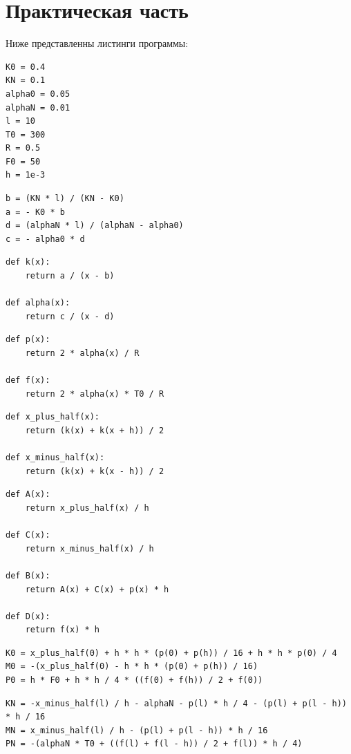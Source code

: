 \chapter{Практическая часть}

Ниже представленны листинги программы:

\lstset{language=python}
\begin{lstlisting}[caption=Исходные данные]
K0 = 0.4
KN = 0.1
alpha0 = 0.05
alphaN = 0.01
l = 10
T0 = 300
R = 0.5
F0 = 50
h = 1e-3
\end{lstlisting}

\lstset{language=python}
\begin{lstlisting}[caption=Параметры для краевых условий]
b = (KN * l) / (KN - K0)
a = - K0 * b
d = (alphaN * l) / (alphaN - alpha0)
c = - alpha0 * d
\end{lstlisting}

\lstset{language=python}
\begin{lstlisting}[caption=Коэффициенты теплопроводности и теплоотдачи]
def k(x):
    return a / (x - b)

def alpha(x):
    return c / (x - d)
\end{lstlisting}

\lstset{language=python}
\begin{lstlisting}[caption=Выполнение замены]
def p(x):
    return 2 * alpha(x) / R

def f(x):
    return 2 * alpha(x) * T0 / R
\end{lstlisting}

\lstset{language=python}
\begin{lstlisting}[caption=Простая аппроксимация]
def x_plus_half(x):
    return (k(x) + k(x + h)) / 2

def x_minus_half(x):
    return (k(x) + k(x - h)) / 2
\end{lstlisting}

\lstset{language=python}
\begin{lstlisting}[caption=Разностная схема]
def A(x):
    return x_plus_half(x) / h

def C(x):
    return x_minus_half(x) / h

def B(x):
    return A(x) + C(x) + p(x) * h

def D(x):
    return f(x) * h
\end{lstlisting}

\lstset{language=python}
\begin{lstlisting}[caption=Краевые условия при x = 0]
K0 = x_plus_half(0) + h * h * (p(0) + p(h)) / 16 + h * h * p(0) / 4
M0 = -(x_plus_half(0) - h * h * (p(0) + p(h)) / 16)
P0 = h * F0 + h * h / 4 * ((f(0) + f(h)) / 2 + f(0))
\end{lstlisting}
\lstset{language=python}
\begin{lstlisting}[caption=Краевые условия при x = N]
KN = -x_minus_half(l) / h - alphaN - p(l) * h / 4 - (p(l) + p(l - h)) * h / 16
MN = x_minus_half(l) / h - (p(l) + p(l - h)) * h / 16
PN = -(alphaN * T0 + ((f(l) + f(l - h)) / 2 + f(l)) * h / 4)
\end{lstlisting}

